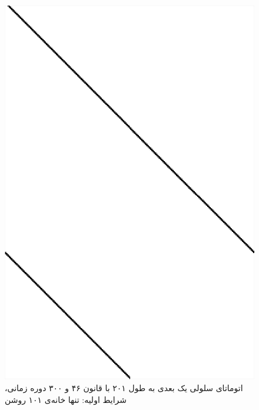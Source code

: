\documentclass[11pt, a4paper]{article}
\begin{document}
\begin{figure}[!tbp]
  \centering
  \begin{minipage}[b]{0.3\textwidth}
    \includegraphics[width=\textwidth]{q3-46}
    \caption{اتوماتای سلولی یک بعدی به طول ۲۰۱ با قانون ۴۶ و ۳۰۰ دوره زمانی، شرایط اولیه: تنها خانه‌ی ۱۰۱ روشن}
    \label{fig:q3-46}
  \end{minipage}
  \hfill
  \begin{minipage}[b]{0.3\textwidth}

\end{minipage}
\end{figure}
\end{document}
